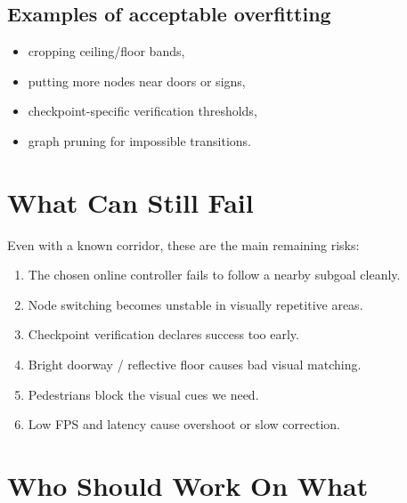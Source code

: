 \documentclass[11pt,a4paper]{article}
\begin{document}
\subsection*{Examples of acceptable overfitting}

\begin{itemize}[nosep]
  \item cropping ceiling/floor bands,
  \item putting more nodes near doors or signs,
  \item checkpoint-specific verification thresholds,
  \item graph pruning for impossible transitions.
\end{itemize}


\section{What Can Still Fail}

Even with a known corridor, these are the main remaining risks:

\begin{enumerate}[nosep]
  \item The chosen online controller fails to follow a nearby subgoal cleanly.
  \item Node switching becomes unstable in visually repetitive areas.
  \item Checkpoint verification declares success too early.
  \item Bright doorway / reflective floor causes bad visual matching.
  \item Pedestrians block the visual cues we need.
  \item Low FPS and latency cause overshoot or slow correction.
\end{enumerate}


\section{Who Should Work On What}
\end{document}
